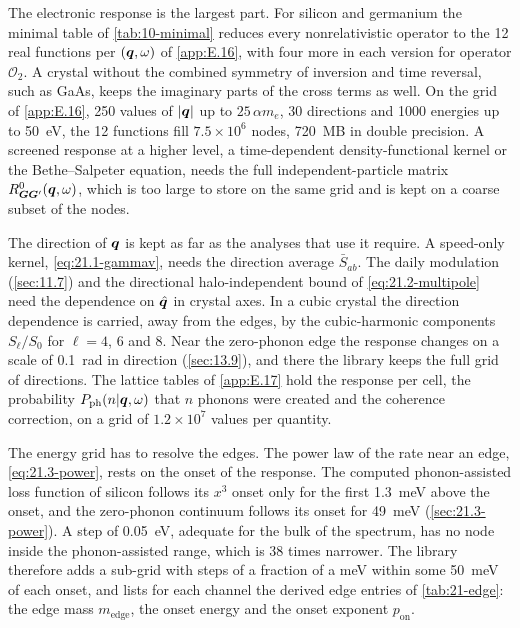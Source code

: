 The electronic response is the largest part. For silicon and germanium the minimal table of \cref{tab:10-minimal} reduces every nonrelativistic operator to the 12 real functions per $(\bm{q},\omega)$ of \cref{app:E.16}, with four more in each version for operator $\mathcal{O}_2$. A crystal without the combined symmetry of inversion and time reversal, such as GaAs, keeps the imaginary parts of the cross terms as well. On the grid of \cref{app:E.16}, 250 values of $|\bm{q}|$ up to $25\,\alpha m_e$, 30 directions and 1000 energies up to \SI{50}{eV}, the 12 functions fill $7.5\times10^6$ nodes, \SI{720}{MB} in double precision. A screened response at a higher level, a time-dependent density-functional kernel or the Bethe--Salpeter equation, needs the full independent-particle matrix $R^0_{\bm{G}\bm{G}'}(\bm{q},\omega)$, which is too large to store on the same grid and is kept on a coarse subset of the nodes.

The direction of $\bm{q}$ is kept as far as the analyses that use it require. A speed-only kernel, \cref{eq:21.1-gammav}, needs the direction average $\bar S_{ab}$. The daily modulation (\cref{sec:11.7}) and the directional halo-independent bound of \cref{eq:21.2-multipole} need the dependence on $\hat{\bm{q}}$ in crystal axes. In a cubic crystal the direction dependence is carried, away from the edges, by the cubic-harmonic components $S_\ell/S_0$ for $\ell = 4$, 6 and 8. Near the zero-phonon edge the response changes on a scale of \SI{0.1}{rad} in direction (\cref{sec:13.9}), and there the library keeps the full grid of directions. The lattice tables of \cref{app:E.17} hold the response per cell, the probability $P_{\mathrm{ph}}(n|\bm{q},\omega)$ that $n$ phonons were created and the coherence correction, on a grid of $1.2\times10^7$ values per quantity.

The energy grid has to resolve the edges. The power law of the rate near an edge, \cref{eq:21.3-power}, rests on the onset of the response. The computed phonon-assisted loss function of silicon follows its $x^3$ onset only for the first \SI{1.3}{meV} above the onset, and the zero-phonon continuum follows its onset for \SI{49}{meV} (\cref{sec:21.3-power}). A step of \SI{0.05}{eV}, adequate for the bulk of the spectrum, has no node inside the phonon-assisted range, which is 38 times narrower. The library therefore adds a sub-grid with steps of a fraction of a meV within some \SI{50}{meV} of each onset, and lists for each channel the derived edge entries of \cref{tab:21-edge}: the edge mass $m_{\mathrm{edge}}$, the onset energy and the onset exponent $p_{\mathrm{on}}$.

